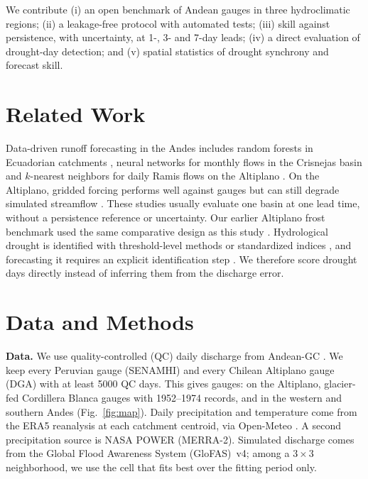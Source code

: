 \documentclass[graybox]{svmult}
\begin{document}
We contribute (i) an open benchmark of \nGauges{} Andean gauges in three hydroclimatic regions; (ii) a leakage-free protocol with automated tests; (iii) skill against persistence, with uncertainty, at 1-, 3- and 7-day leads; (iv) a direct evaluation of drought-day detection; and (v) spatial statistics of drought synchrony and forecast skill.

\section{Related Work}
\label{sec:related}

Data-driven runoff forecasting in the Andes includes random forests in Ecuadorian catchments \cite{munoz2018rf}, neural networks for monthly flows in the Crisnejas basin \cite{ramos2023crisnejas} and $k$-nearest neighbors for daily Ramis flows on the Altiplano \cite{quispe2023ramis}. On the Altiplano, gridded forcing performs well against gauges but can still degrade simulated streamflow \cite{lujano2025gridded}. These studies usually evaluate one basin at one lead time, without a persistence reference or uncertainty. Our earlier Altiplano frost benchmark used the same comparative design as this study \cite{torres2025frost}. Hydrological drought is identified with threshold-level methods or standardized indices \cite{vanloon2015explained}, and forecasting it requires an explicit identification step \cite{sutanto2021definitions}. We therefore score drought days directly instead of inferring them from the discharge error.

\section{Data and Methods}
\label{sec:methods}

\textbf{Data.} We use quality-controlled (QC) daily discharge from Andean-GC \cite{aguayo2026andeangc}. We keep every Peruvian gauge (SENAMHI) and every Chilean Altiplano gauge (DGA) with at least 5000 QC days. This gives \nGauges{} gauges: \nGaugesAlti{} on the Altiplano, \nGaugesCB{} glacier-fed Cordillera Blanca gauges with 1952--1974 records, and \nGaugesWSA{} in the western and southern Andes (Fig.~\ref{fig:map}). Daily precipitation and temperature come from the ERA5 reanalysis \cite{hersbach2020era5} at each catchment centroid, via Open-Meteo \cite{openmeteo}. A second precipitation source is NASA POWER (MERRA-2). Simulated discharge comes from the Global Flood Awareness System (GloFAS)~v4; among a $3\times3$ neighborhood, we use the cell that fits best over the fitting period only.
\end{document}
